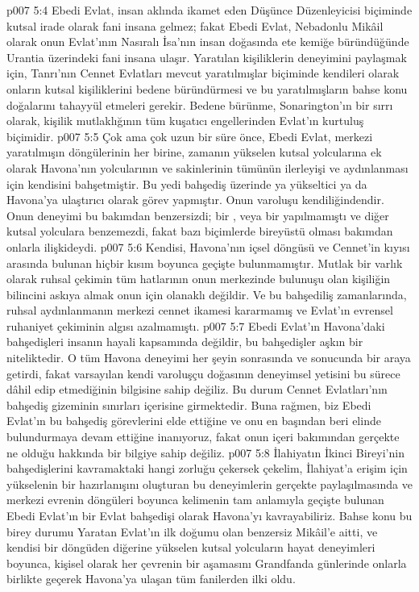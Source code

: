 \vs p007 5:4 Ebedi Evlat, insan aklında ikamet eden Düşünce Düzenleyicisi biçiminde kutsal irade olarak fani insana gelmez; fakat Ebedi Evlat, Nebadonlu Mikâil olarak onun Evlat’ının   Nasıralı İsa’nın insan doğasında ete kemiğe büründüğünde Urantia üzerindeki fani insana ulaşır. Yaratılan kişiliklerin deneyimini paylaşmak için, Tanrı'nın Cennet Evlatları mevcut yaratılmışlar biçiminde kendileri olarak onların kutsal kişiliklerini bedene büründürmesi ve bu yaratılmışların bahse konu doğalarını tahayyül etmeleri gerekir. Bedene bürünme, Sonarington’ın bir sırrı olarak, kişilik mutlaklığının tüm kuşatıcı engellerinden Evlat’ın kurtuluş biçimidir.
\vs p007 5:5 Çok ama çok uzun bir süre önce, Ebedi Evlat, merkezi yaratılmışın döngülerinin her birine, zamanın yükselen kutsal yolcularına ek olarak Havona’nın yolcularının ve sakinlerinin tümünün ilerleyişi ve aydınlanması için kendisini bahşetmiştir. Bu yedi bahşediş üzerinde ya yükseltici ya da Havona’ya ulaştırıcı olarak görev yapmıştır. Onun varoluşu kendiliğindendir. Onun deneyimi bu bakımdan benzersizdi; bir , veya bir  yapılmamıştı ve diğer kutsal yolculara benzemezdi, fakat bazı biçimlerde bireyüstü olması bakımdan onlarla ilişkideydi.
\vs p007 5:6 Kendisi, Havona’nın içsel döngüsü ve Cennet’in kıyısı arasında bulunan hiçbir kısım boyunca geçişte bulunmamıştır. Mutlak bir varlık olarak ruhsal çekimin tüm hatlarının onun merkezinde bulunuşu olan kişiliğin bilincini askıya almak onun için olanaklı değildir. Ve bu bahşediliş zamanlarında, ruhsal aydınlanmanın merkezi cennet ikamesi kararmamış ve Evlat’ın evrensel ruhaniyet çekiminin algısı azalmamıştı.
\vs p007 5:7 Ebedi Evlat’ın Havona’daki bahşedişleri insanın hayali kapsamında değildir, bu bahşedişler aşkın bir niteliktedir. O tüm Havona deneyimi her şeyin sonrasında ve sonucunda bir araya getirdi, fakat varsayılan kendi varoluşçu doğasının deneyimsel yetisini bu sürece dâhil edip etmediğinin bilgisine sahip değiliz. Bu durum Cennet Evlatları’nın bahşediş gizeminin sınırları içerisine girmektedir. Buna rağmen, biz Ebedi Evlat’ın bu bahşediş görevlerini elde ettiğine ve onu en başından beri elinde bulundurmaya devam ettiğine inanıyoruz, fakat onun içeri bakımından gerçekte ne olduğu hakkında bir bilgiye sahip değiliz.
\vs p007 5:8 İlahiyatın İkinci Bireyi’nin bahşedişlerini kavramaktaki hangi zorluğu çekersek çekelim, İlahiyat’a erişim için yükselenin bir hazırlanışını oluşturan bu deneyimlerin gerçekte paylaşılmasında ve merkezi evrenin döngüleri boyunca kelimenin tam anlamıyla geçişte bulunan Ebedi Evlat’ın bir Evlat bahşedişi olarak Havona’yı kavrayabiliriz. Bahse konu bu birey durumu Yaratan Evlat’ın ilk doğumu olan benzersiz Mikâil’e aitti, ve kendisi bir döngüden diğerine yükselen kutsal yolcuların hayat deneyimleri boyunca, kişisel olarak her çevrenin bir aşamasını Grandfanda günlerinde onlarla birlikte geçerek Havona’ya ulaşan tüm fanilerden ilki oldu.
